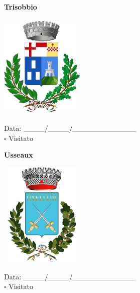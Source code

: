 \documentclass[a5paper,12pt]{article}
\begin{document}
\vspace{0.7cm}

\noindent
\begin{minipage}[t]{0.45\textwidth}
    \begin{center}
        \textbf{Trisobbio}
    \end{center}
    \vspace{-0.5cm} %
    \begin{center}
        \includegraphics[height= 5cm, width=4cm]{Piemonte/Stemma Trisobbio.png}
    \end{center}
    \vspace{-0.4cm} %
    \begin{flushleft}
        Data: \_\_\_\_/\_\_\_\_/\_\_\_\_\_\_\_\_\_\_\_\_ \\
        $\square$ Visitato
    \end{flushleft}
\end{minipage}
\hfill
\noindent
\begin{minipage}[t]{0.45\textwidth}
    \begin{center}
        \textbf{Usseaux}
    \end{center}
    \vspace{-0.5cm} %
    \begin{center}
        \includegraphics[height= 5cm, width=4cm]{Piemonte/Stemma Usseaux.png}
    \end{center}
    \vspace{-0.4cm} %
    \begin{flushleft}
        Data: \_\_\_\_/\_\_\_\_/\_\_\_\_\_\_\_\_\_\_\_\_ \\
        $\square$ Visitato
    \end{flushleft}
\end{minipage}
\end{document}
